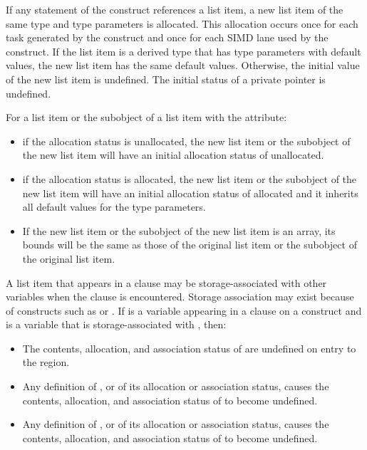 \begin{fortranspecific}
If any statement of the construct references a list item, a new list
item of the same type and type parameters is allocated. This
allocation occurs once for each task generated by the construct and
once for each SIMD lane used by the construct.  If the list item is a
derived type that has type parameters with default values, the new
list item has the same default values.  Otherwise, the initial value
of the new list item is undefined. The initial status of a private
pointer is undefined.

For a list item or the subobject of a list item with the  attribute:

\begin{itemize}
\item if the allocation status is unallocated, the new list item or the subobject
of the new list item will have an initial allocation status of unallocated.

\item if the allocation status is allocated, the new list item or the subobject of
the new list item will have an initial allocation status of allocated
and it inherits all default values for the type parameters.

\item If the new list item or the subobject of the new list item is an array, its bounds will be
the same as those of the original list item or the subobject of the original list item.
\end{itemize}

A list item that appears in a  clause may be storage-associated with other
variables when the  clause is encountered. Storage association may exist
because of constructs such as  or . If  is a variable appearing
in a  clause on a construct and  is a variable that is storage-associated with , then:

\begin{itemize}
\item The contents, allocation, and association status of  are undefined on entry to the region.

\item Any definition of , or of its allocation or association status, causes the contents,
allocation, and association status of  to become undefined.

\item Any definition of , or of its allocation or association status, causes the contents,
allocation, and association status of  to become undefined.
\end{itemize}


\end{fortranspecific}
